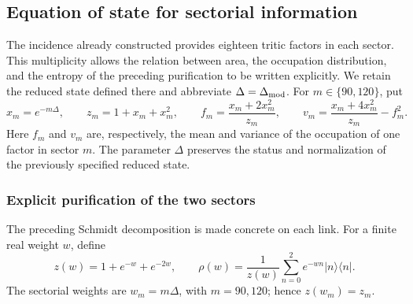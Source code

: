 \subsection{Equation of state for sectorial information}
\label{sec:ii-ecuacion-informacion}

The incidence already constructed provides eighteen tritic factors in
each sector. This multiplicity allows the relation between area,
the occupation distribution, and the entropy of the preceding
purification to be written explicitly. We retain the reduced state defined there
and abbreviate $\Delta=\Delta_{\rm mod}$. For $m\in\{90,120\}$, put
\begin{equation}
 x_m=e^{-m\Delta},\qquad z_m=1+x_m+x_m^2,\qquad
 f_m=\frac{x_m+2x_m^2}{z_m},\qquad
 v_m=\frac{x_m+4x_m^2}{z_m}-f_m^2.
 \label{eq:ii-sector-momentos}
\end{equation}
Here $f_m$ and $v_m$ are, respectively, the mean and variance of
the occupation of one factor in sector $m$. The parameter $\Delta$ preserves
the status and normalization of the previously specified reduced
state.

\subsubsection{Explicit purification of the two sectors}
\label{sec:ii-area-purificacion-producto}

The preceding Schmidt decomposition is made concrete on each link.
For a finite real weight \(w\), define
\[
 z(w)=1+e^{-w}+e^{-2w},\qquad
 \rho(w)=\frac1{z(w)}\sum_{n=0}^2e^{-wn}|n\rangle\langle n|.
\]
The sectorial weights are \(w_m=m\Delta\), with \(m=90,120\);
hence \(z(w_m)=z_m\).

